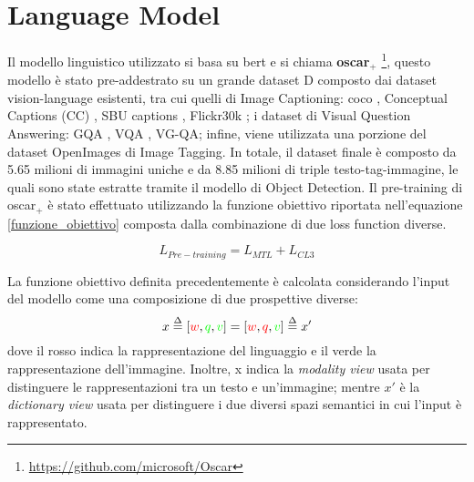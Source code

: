 \section{Language Model}
Il modello linguistico utilizzato si basa su \acrshort{bert} \cite{devlin2018bert} e si chiama \textbf{\acrshort{oscar}$_+$} \footnote{\url{https://github.com/microsoft/Oscar}}, questo modello è stato pre-addestrato su un grande dataset D composto dai dataset vision-language esistenti, tra cui quelli di Image Captioning: \acrshort{coco} \cite{lin2014microsoft}, Conceptual Captions (CC) \cite{sharma2018conceptual}, SBU captions \cite{ordonez2011im2text}, Flickr30k \cite{young2014image}; i dataset di Visual Question Answering: GQA \cite{hudson2019gqa}, VQA \cite{goyal2017making}, VG-QA; infine, viene utilizzata una porzione del dataset OpenImages di Image Tagging. In totale, il dataset finale è composto da 5.65 milioni di immagini uniche e da 8.85 milioni di triple testo-tag-immagine, le quali sono state estratte tramite il modello di Object Detection.
Il pre-training di \acrshort{oscar}$_+$ è stato effettuato utilizzando la funzione obiettivo riportata nell'equazione \ref{funzione_obiettivo} composta dalla combinazione di due loss function diverse.

\begin{equation}\label{funzione_obiettivo}
L_{Pre-training} = L_{MTL} + L_{CL3}
\end{equation}

La funzione obiettivo definita precedentemente è calcolata considerando l'input del modello come una composizione di due prospettive diverse:
\begin{equation*}
x \stackrel{\Delta}{=} [\textcolor{red}{w}, \textcolor{green}{q}, \textcolor{green}{v}] = [\textcolor{red}{w}, \textcolor{red}{q} , \textcolor{green}{v}] \stackrel{\Delta}{=} x'
\end{equation*}
dove il rosso indica la rappresentazione del linguaggio e il verde la rappresentazione dell'immagine.
Inoltre, x indica la \textit{modality view} usata per distinguere le rappresentazioni tra un testo e un'immagine; mentre $x'$ è la \textit{dictionary view} usata per distinguere i due diversi spazi semantici in cui l'input è rappresentato.


